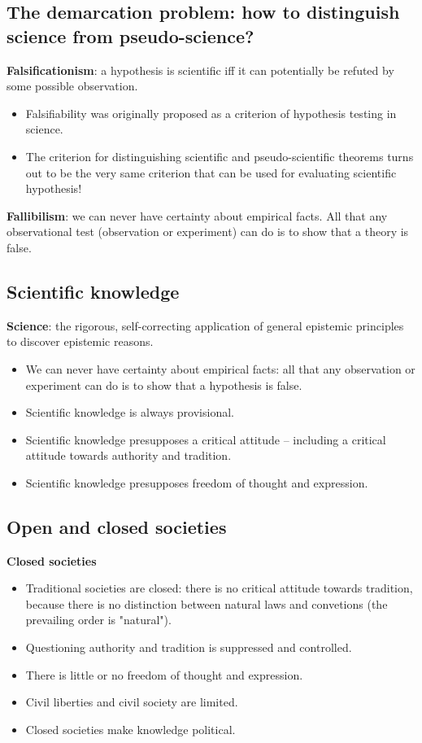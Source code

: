 \subsection{The demarcation problem: how to distinguish science from
pseudo-science?}
\textbf{Falsificationism}: a hypothesis is scientific iff it can potentially be
refuted by some possible observation.

\begin{itemize}
	\item Falsifiability was originally proposed as a criterion of
	 hypothesis testing in science.
	\item The criterion for distinguishing scientific and pseudo-scientific
	 theorems turns out to be the very same criterion that can be used for
	 evaluating scientific hypothesis!
\end{itemize}

\textbf{Fallibilism}: we can never have certainty about empirical facts. All
that any observational test (observation or experiment) can do is to show that
a theory is false.

\subsection{Scientific knowledge}

\textbf{Science}: the rigorous, self-correcting application of general
epistemic principles to discover epistemic reasons.
\begin{itemize}
	\item We can never have certainty about empirical facts: all that
	 any observation or experiment can do is to show that a hypothesis is
	 false.
	\item Scientific knowledge is always provisional.
	\item Scientific knowledge presupposes a critical attitude -- including
	 a critical attitude towards authority and tradition.
	\item Scientific knowledge presupposes freedom of thought and
	 expression.
\end{itemize}

\subsection{Open and closed societies}
\textbf{Closed societies}
\begin{itemize}
	\item Traditional societies are closed: there is no critical attitude
	 towards tradition, because there is no distinction between natural
	 laws and convetions (the prevailing order is "natural").
	\item Questioning authority and tradition is suppressed and
	 controlled.
	\item There is little or no freedom of thought and expression.
	\item Civil liberties and civil society are limited.
	\item Closed societies make knowledge political.
\end{itemize}

